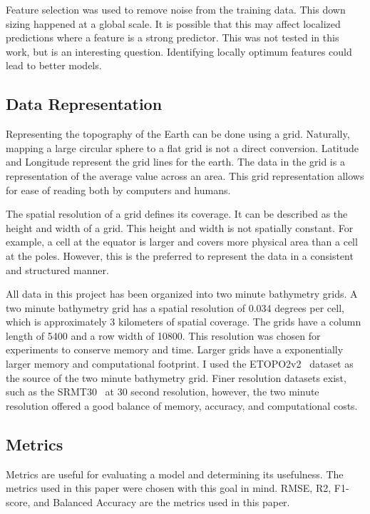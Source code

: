 \par
Feature selection was used to remove noise from the training data.
This down sizing happened at a global scale.
It is possible that this may affect localized predictions where a feature is a strong predictor.
This was not tested in this work, but is an interesting question.
Identifying locally optimum features could lead to better models.


\subsection{Data Representation}
Representing the topography of the Earth can be done using a grid. 
Naturally, mapping a large circular sphere to a flat grid is not a direct conversion.
Latitude and Longitude represent the grid lines for the earth.
The data in the grid is a representation of the average value across an area.
This grid representation allows for ease of reading both by computers and humans.

\par
The spatial resolution of a grid defines its coverage.
It can be described as the height and width of a grid.
This height and width is not spatially constant.
For example, a cell at the equator is larger and covers more physical area than a cell at the poles.
However, this is the preferred to represent the data in a consistent and structured manner.

\par
All data in this project has been organized into two minute bathymetry grids.
A two minute bathymetry grid has a spatial resolution of 0.034 degrees per cell, which is approximately 3 kilometers of spatial coverage.
The grids have a column length of 5400 and a row width of 10800.
This resolution was chosen for experiments to conserve memory and time.
Larger grids have a exponentially larger memory and computational footprint.
I used the \ac{ETOPO}2v2~\cite{national1988etopo} dataset as the source of the two minute bathymetry grid.
Finer resolution datasets exist, such as the SRMT30~\cite{becker2009global} at 30 second resolution, however, the two minute resolution offered a good balance of memory, accuracy, and computational costs.

\subsection{Metrics}
Metrics are useful for evaluating a model and determining its usefulness.
The metrics used in this paper were chosen with this goal in mind.
RMSE, R2, F1-score, and Balanced Accuracy are the metrics used in this paper.


